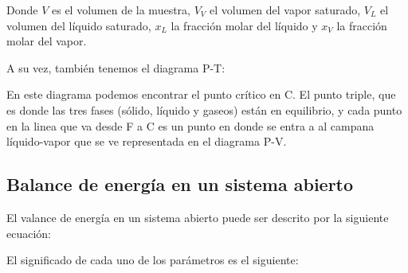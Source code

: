 
Donde $V$ es el volumen de la muestra, $V_V$ el volumen del vapor saturado, $V_L$ el volumen del líquido saturado, $x_L$ la fracción molar del líquido y $x_V$ la fracción molar del vapor.

A su vez, también tenemos el diagrama P-T:


En este diagrama podemos encontrar el punto crítico en C. El punto triple, que es donde las tres fases (sólido, líquido y gaseos) están en equilibrio, y cada punto en la linea que va desde F a C es un punto en donde se entra a al campana líquido-vapor que se ve representada en el diagrama P-V.

\subsection{Balance de energía en un sistema abierto}

El valance de energía en un sistema abierto puede ser descrito por la siguiente ecuación:



El significado de cada uno de los parámetros es el siguiente:

